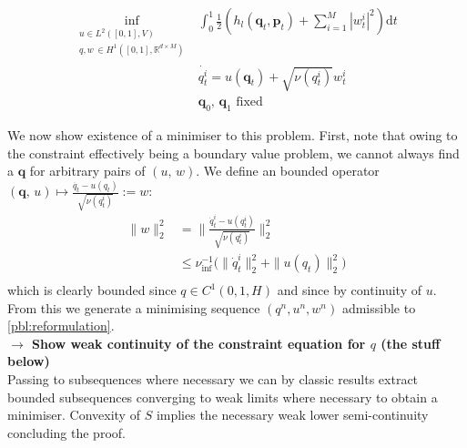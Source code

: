 \documentclass[runningheads]{llncs}
\newcommand{\half}{\frac 12}
\newcommand{\norm}[2]{\| #1 \|_{ #2 }}
\newcommand{\ltwonorm}[1]{\norm{ #1 }{2}}
\newcommand{\diff}[1]{\text{d} #1}
\newcommand{\RdM}{\mathbb{R}^{d\times M}}
\newcommand{\nuinf}{\nu_\text{inf}}
\begin{document}
\begin{align}
\inf_{\substack{u \in L^2([0,1],V)\\ q, w\, \in H^1([0,1],\RdM)}}
    & \int_0^1\half\left (h_l(\mathbf q_t,\mathbf p_t)  +\sum_{i=1}^M |w_t^i|^2\right )\diff{t}\\
    & \dot{q_t^i} = u(\mathbf q_t) + \sqrt{\nu(q_t^i)} w^i_t\\
    & \mathbf q_0,\,\mathbf q_1\text{ fixed}
  \label{pbl:reformulation}
\end{align}

We now show existence of a minimiser to this problem. First, note that owing to
the constraint effectively being a boundary value problem, we cannot always find
a $\mathbf q$ for arbitrary pairs of $(u,\,w)$. We define an bounded operator
$(\mathbf q,\, u)\mapsto \frac{\dot{q_t} - u(q_t)}{\sqrt{\nu(q_t^i)}} := w$:
\begin{align*}
\ltwonorm{w}^2 & = \ltwonorm{\frac{\dot{q}_t^i - u(q_t^i)}{\sqrt{\nu(q_t^i)}}}^2\\
& \leq \nuinf^{-1}\Big(\ltwonorm{\dot{q}_t^i}^2 + \ltwonorm{u(q_t)}^2\Big)\\
\end{align*}
which is clearly bounded since $q\in C^1(0,1,H)$ and since by continuity of $u$.
From this we generate a minimising sequence $(q^n, u^n, w^n)$ admissible to
\eqref{pbl:reformulation}.\\

\textbf{$\longrightarrow$ Show weak continuity of the constraint equation for
$q$ (the stuff below)}\\

Passing to subsequences where necessary we can by classic results
\cite{younes2010shapes} extract bounded subsequences converging to weak limits
where necessary to obtain a minimiser. Convexity of $S$ implies the necessary
weak lower semi-continuity concluding the proof.


\iffalse
\end{document}
